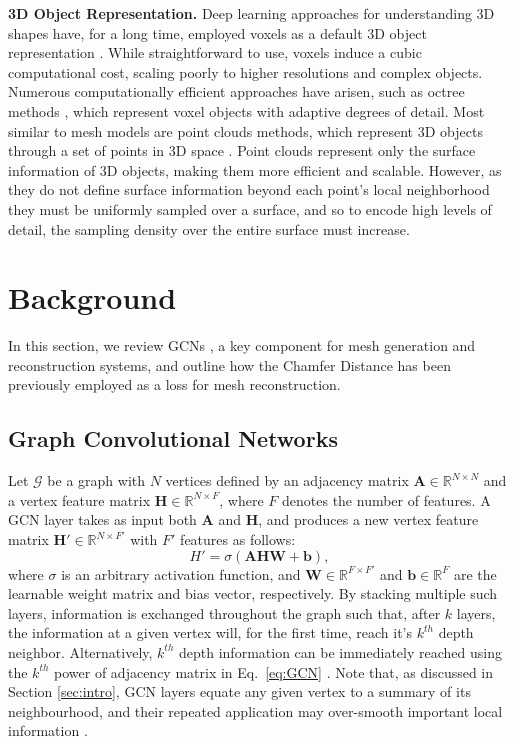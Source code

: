 \documentclass{article}
\begin{document}
\textbf{3D Object Representation.} \enskip 
Deep learning approaches for understanding 3D shapes have, for a long time, employed voxels as a default 3D object representation \cite{choy20163d, 3DGAN, mine, tulsiani2017multi, marrnet, wu2018learning}. While straightforward to use, voxels induce a cubic computational cost, scaling poorly to higher resolutions and complex objects. Numerous computationally efficient approaches have arisen, such as octree methods \cite{riegler2017octnet, OGN, HSP}, which represent voxel objects with adaptive degrees of detail. 
Most similar to mesh models are point clouds methods, which represent 3D objects through a set of points in 3D space \cite{fan2017point, qi2017pointnet, insafutdinov2018unsupervised, novotny2017learning}. Point clouds represent only the surface information of 3D objects, making them more efficient and scalable. However, as they do not define surface information beyond each point's local neighborhood they must be uniformly sampled over a surface, and so to encode high levels of detail, the sampling density over the entire surface must increase. 

\section{Background}

In this section, we review GCNs \cite{GCN}, a key component for mesh generation and reconstruction systems, and outline how the Chamfer Distance has been previously employed as a loss for mesh reconstruction. 


\subsection{Graph Convolutional Networks}
\label{ssec:GCN}
Let $\mathcal{G}$ be a graph with $N$ vertices defined by an adjacency matrix $\mathbf{A} \in \mathbb{R}^{N \times N}$ and a vertex feature matrix $\mathbf{H} \in \mathbb{R}^{N \times F}$, where $F$ denotes the number of features. 
A GCN layer takes as input both $\mathbf{A}$ and $\mathbf{H}$, and produces a new vertex feature matrix $\mathbf{H'}\in \mathbb{R}^{N \times F'}$ with $F'$ features as follows:
\begin{equation}
H' = \sigma( \mathbf{A} \mathbf{H} \mathbf{W}  + \mathbf{b}),
\label{eq:GCN}
\end{equation}
where $\sigma$ is an arbitrary activation function, and $\mathbf{W} \in \mathbb{R}^{F \times F'}$ and $\mathbf{b} \in \mathbb{R}^F$ are the learnable weight matrix and bias vector, respectively. By stacking multiple such layers, information is exchanged throughout the graph such that, after $k$ layers, the information at a given vertex will, for the first time, reach it's $k^{th}$ depth neighbor. Alternatively, $k^{th}$ depth information can be immediately reached using the $k^{th}$ power of adjacency matrix in Eq.~\ref{eq:GCN} \cite{Defferrard:2016:CNN:3157382.3157527, levie2017cayleynets, Cucurull2018ConvolutionalNN}. Note that, as discussed in Section \ref{sec:intro}, GCN layers equate any given vertex to a summary of its neighbourhood, and their repeated application may over-smooth important local information \cite{Li2018DeeperII}.
\end{document}
